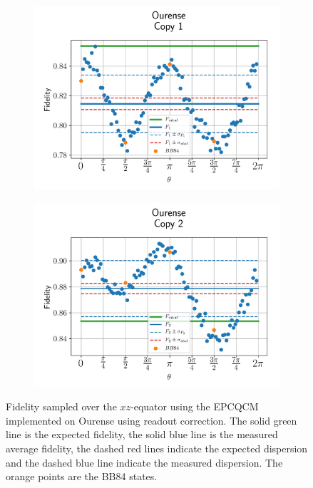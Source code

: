 \begin{figure}[H]
  \centering
  \begin{subfigure}{.5\textwidth}
    \centering
    \includegraphics[width=\textwidth]{Figures/Economical/IBM/OnlyEquator/results_corrected_ourense_copy1.png}
    \label{fig:epc_corrected_ourense_equator_1}
  \end{subfigure}%
  \begin{subfigure}{.5\textwidth}
    \centering
    \includegraphics[width=\textwidth]{Figures/Economical/IBM/OnlyEquator/results_corrected_ourense_copy2.png}
    \label{fig:epc_corrected_ourense_equator_2}
  \end{subfigure}
  \vspace{-0.5cm}
  \caption{Fidelity sampled over the $xz$-equator using the EPCQCM implemented on Ourense using readout correction. The solid green line is the expected fidelity, the solid blue line is the measured average fidelity, the dashed red lines indicate the expected dispersion and the dashed blue line indicate the measured dispersion. The orange points are the BB84 states.}
  \label{fig:epc_corrected_ourense_equator}
\end{figure}

